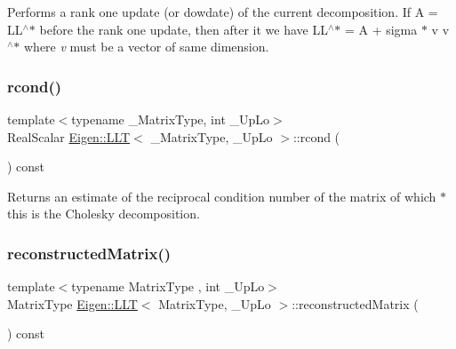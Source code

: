Performs a rank one update (or dowdate) of the current decomposition. If A = L\+L$^\wedge$$\ast$ before the rank one update, then after it we have L\+L$^\wedge$$\ast$ = A + sigma $\ast$ v v$^\wedge$$\ast$ where {\itshape v} must be a vector of same dimension. \mbox{\label{class_eigen_1_1_l_l_t_a59338fa78db171d02fd5a2c9e4f3a30c}} 
\subsubsection{\texorpdfstring{rcond()}{rcond()}}
{\footnotesize\ttfamily template$<$typename \+\_\+\+Matrix\+Type, int \+\_\+\+Up\+Lo$>$ \\
Real\+Scalar \mbox{\hyperlink{class_eigen_1_1_l_l_t}{Eigen\+::\+L\+LT}}$<$ \+\_\+\+Matrix\+Type, \+\_\+\+Up\+Lo $>$\+::rcond (\begin{DoxyParamCaption}{ }\end{DoxyParamCaption}) const\hspace{0.3cm}{\ttfamily [inline]}}

\begin{DoxyReturn}{Returns}
an estimate of the reciprocal condition number of the matrix of which {\ttfamily $\ast$this} is the Cholesky decomposition. 
\end{DoxyReturn}
\mbox{\label{class_eigen_1_1_l_l_t_a8b6ba1bc41811c50e65cac8db597d802}} 
\subsubsection{\texorpdfstring{reconstructedMatrix()}{reconstructedMatrix()}}
{\footnotesize\ttfamily template$<$typename Matrix\+Type , int \+\_\+\+Up\+Lo$>$ \\
Matrix\+Type \mbox{\hyperlink{class_eigen_1_1_l_l_t}{Eigen\+::\+L\+LT}}$<$ Matrix\+Type, \+\_\+\+Up\+Lo $>$\+::reconstructed\+Matrix (\begin{DoxyParamCaption}{ }\end{DoxyParamCaption}) const}

